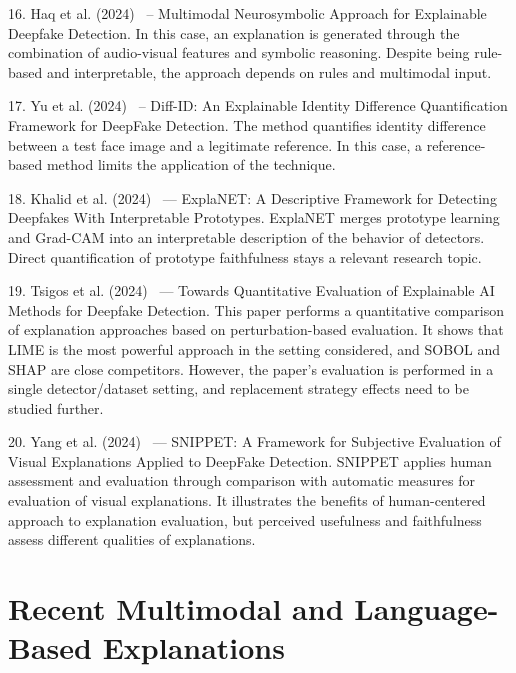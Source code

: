 \documentclass[12pt,a4wide]{report}
\theoremstyle{plain}
\theoremstyle{definition}
\theoremstyle{remark}
\begin{document}
\begin{description}
    \item 16. Haq et al. (2024)~\cite{haq2024neurosymbolic} – Multimodal Neurosymbolic Approach for Explainable Deepfake Detection. In this case, an explanation is generated through the combination of audio-visual features and symbolic reasoning. Despite being rule-based and interpretable, the approach depends on rules and multimodal input.

    \item 17. Yu et al. (2024)~\cite{yu2024diffid} – Diff-ID: An Explainable Identity Difference Quantification Framework for DeepFake Detection. The method quantifies identity difference between a test face image and a legitimate reference. In this case, a reference-based method limits the application of the technique.

    \item 18. Khalid et al. (2024)~\cite{khalid2024explanet} — ExplaNET: A Descriptive Framework for Detecting Deepfakes With Interpretable Prototypes. ExplaNET merges prototype learning and Grad-CAM into an interpretable description of the behavior of detectors. Direct quantification of prototype faithfulness stays a relevant research topic.


    \item 19. Tsigos et al. (2024)~\cite{tsigos2024towards} — Towards Quantitative Evaluation of Explainable AI Methods for Deepfake Detection. This paper performs a quantitative comparison of explanation approaches based on perturbation-based evaluation. It shows that LIME is the most powerful approach in the setting considered, and SOBOL and SHAP are close competitors. However, the paper's evaluation is performed in a single detector/dataset setting, and replacement strategy effects need to be studied further.


    \item 20. Yang et al. (2024)~\cite{yang2024snippet} — SNIPPET: A Framework for Subjective Evaluation of Visual Explanations Applied to DeepFake Detection. SNIPPET applies human assessment and evaluation through comparison with automatic measures for evaluation of visual explanations. It illustrates the benefits of human-centered approach to explanation evaluation, but perceived usefulness and faithfulness assess different qualities of explanations.

 
\end{description}

\section{Recent Multimodal and Language-Based Explanations}
\label{sec:faithfulness-lit}
\end{document}
